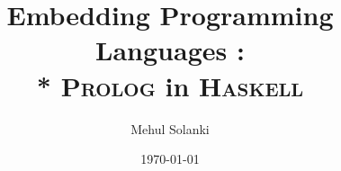 \documentclass[aspectratio=1610]{beamer}
\title[]{Embedding Programming Languages : \\* \textsc{Prolog} in \textsc{Haskell}} %
\author{Mehul Solanki} %
\institute[UNBC] %
{
University of Northern British Columbia \\ %
\medskip
\textit{solanki@unbc.ca} %
\\ 230108015
}
\date{\today} %
\begin{document}
\begin{frame}
\titlepage %
\end{frame}

\end{document}
